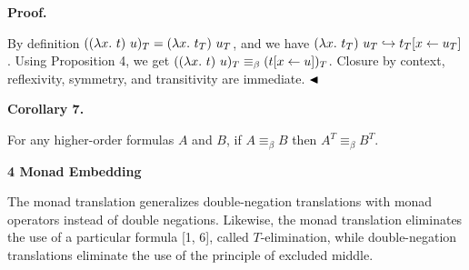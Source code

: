 \documentclass[10pt,a4paper]{article}
\begin{document}
 
 
 
 
\par\medskip\noindent\textbf{Proof.}\par
 
 
By definition $((\lambda x.\leavevmode\nobreak\ t)\leavevmode\nobreak\ u)_{T}=(\lambda x.\leavevmode\nobreak\ t_{T})\leavevmode\nobreak\ u_{T}$, and we have $(\lambda x.\leavevmode\nobreak\ t_{T})\leavevmode\nobreak\ u_{T}\hookrightarrow t_{T}[x\leftarrow u_{T}]$. Using Proposition 4, we get $((\lambda x.\leavevmode\nobreak\ t)\leavevmode\nobreak\ u)_{T}\equiv_{\beta}(t[x\leftarrow u])_{T}$. Closure by context, reflexivity, symmetry, and transitivity are immediate. $\hfill\blacktriangleleft$\par
 
 
 
\par\medskip\noindent\textbf{Corollary 7.}\par
 
 
For any higher-order formulas $A$ and $B$, if $A\equiv_{\beta}B$ then $A^{T}\equiv_{\beta}B^{T}$.\par
 
 
 
 


 
\par\medskip\noindent\textbf{4 Monad Embedding}\par
 
 
The monad translation generalizes double-negation translations with monad operators instead of double negations. Likewise, the monad translation eliminates the use of a particular formula [1, 6], called $T$-elimination, while double-negation translations eliminate the use of the principle of excluded middle.\par
 
\begin{center}\end{center}
 
\end{document}
